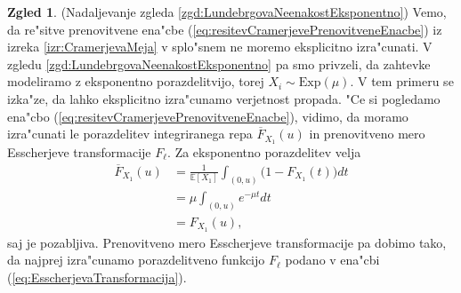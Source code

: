 \documentclass[12pt, a4paper, reqno]{amsart}
\theoremstyle{definition}
\newtheorem{zgled}[definicija]{Zgled}
\theoremstyle{plain}
\newcommand{\E}{\mathbb{E}}
\newcommand{\1}{\mathds{1}}
\begin{document}
            \begin{zgled}(Nadaljevanje zgleda \ref{zgd:LundebrgovaNeenakostEksponentno})
                Vemo, da re"sitve 
                prenovitvene ena"cbe (\ref{eq:resitevCramerjevePrenovitveneEnacbe}) iz izreka \ref{izr:CramerjevaMeja}
                v splo"snem ne moremo eksplicitno izra"cunati.
                V zgledu \ref{zgd:LundebrgovaNeenakostEksponentno} pa smo privzeli, da zahtevke modeliramo 
                z eksponentno porazdelitvijo, torej $X_i\sim\text{Exp}(\mu)$. 
                V tem primeru se izka"ze, da lahko eksplicitno izra"cunamo verjetnost propada.
                "Ce si pogledamo ena"cbo
                (\ref{eq:resitevCramerjevePrenovitveneEnacbe}), vidimo, da moramo 
                izra"cunati le porazdelitev integriranega repa $\overline{F}_{X_1}(u)$ in 
                prenovitveno mero Esscherjeve transformacije $F_\ell$. Za eksponentno porazdelitev
                velja
                \begin{align*}
                    \overline{F}_{X_1}(u)   &= \frac{1}{\E\left[X_1\right]}\int_{(0, u)}\bigl(1 - F_{X_1}(t)\bigr)dt \\
                                            &= \mu\int_{(0, u)}e^{-\mu t}dt \\
                                            &= F_{X_1}(u),
                \end{align*}
                saj je pozabljiva. Prenovitveno mero Esscherjeve transformacije pa dobimo tako, 
                da najprej izra"cunamo porazdelitveno funkcijo $F_\ell$ podano v ena"cbi (\ref{eq:EsscherjevaTransformacija}). 


\end{zgled}
\end{document}
